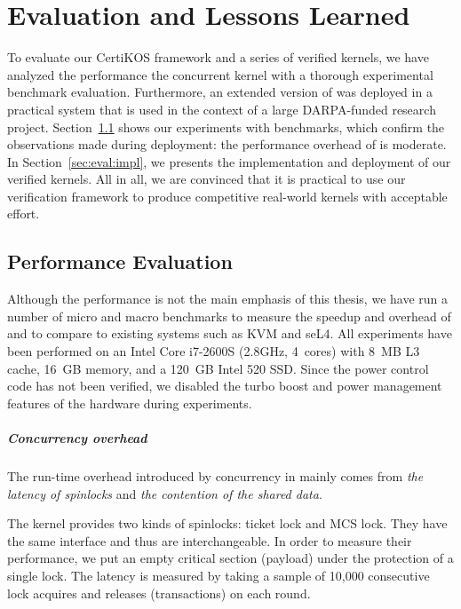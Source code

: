 
\chapter{Evaluation and Lessons Learned}
\label{chap-eval}
To evaluate
our CertiKOS framework
and a series of verified kernels,
we have analyzed the performance  the  \cCTOS{} concurrent kernel
with a thorough experimental benchmark evaluation.
Furthermore, an extended version of \cCTOS{}
was deployed in a practical system that is used in the context of a
large DARPA-funded research project. 
Section~\ref{sec:eval:perform} shows our experiments with benchmarks, which
confirm the observations made during deployment: the performance
overhead of \cCTOS{} is moderate. 
In Section~\ref{sec:eval:impl},
we presents the implementation and deployment of
our verified kernels.
All in all, we are convinced that it is
practical to use our verification framework to produce competitive
real-world kernels with acceptable effort.


\section{Performance Evaluation} 
\label{sec:eval:perform}
Although the performance is not the main
emphasis of this thesis, we have run a number of micro and macro
benchmarks to measure the speedup and overhead of {\cCTOS} and to
compare {\cCTOS} to existing systems such as KVM and seL4. All
experiments have been performed on an Intel Core i7-2600S (2.8GHz,
4~cores) with 8~MB L3 cache, 16~GB memory, and a 120~GB
Intel 520 SSD. Since the power control code has not been verified, we
disabled the turbo boost and power management features of the hardware
during experiments.


\paragraph{Concurrency overhead} The run-time overhead introduced by concurrency
in {\cCTOS} mainly comes from \emph{the latency of spinlocks} and
\emph{the contention of the shared data}.

The {\cCTOS} kernel provides two kinds of spinlocks: ticket lock and
MCS lock. They have the same interface and thus are
interchangeable. In order to measure their performance, we put an
empty critical section (payload) under the protection of a single
lock. The latency is measured by taking a sample of 10,000 consecutive
lock acquires and releases (transactions) on each round.


